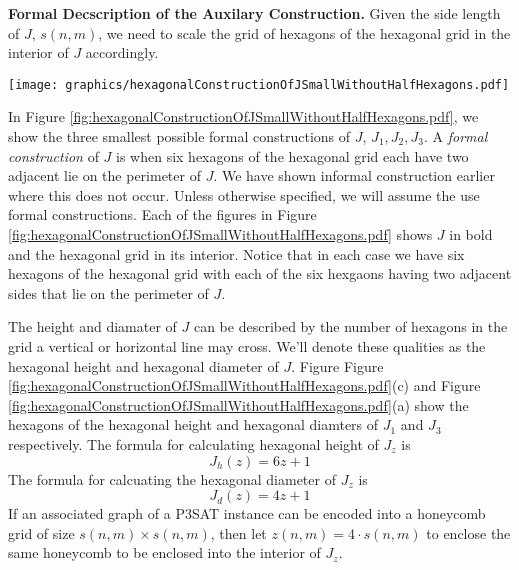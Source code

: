 \documentclass[10pt]{CSUNthesis}
\theoremstyle{plain}%
\theoremstyle{definition}
\theoremstyle{remark}
\begin{document}
\textbf{Formal Decscription of the Auxilary Construction.}
Given the side length of $J$, $s(n,m)$, we need to scale the grid of hexagons of the hexagonal grid in the interior of $J$ accordingly.

\begin{minipage}{\linewidth}
\begin{center}
\texttt{[image: graphics/hexagonalConstructionOfJSmallWithoutHalfHexagons.pdf]}
\label{fig:hexagonalConstructionOfJSmallWithoutHalfHexagons.pdf}
\end{center}
\end{minipage}

In Figure \ref{fig:hexagonalConstructionOfJSmallWithoutHalfHexagons.pdf}, we show the three smallest possible formal constructions of $J$, $J_1, J_2, J_3$.  
A \textit{formal construction} of $J$ is when six hexagons of the hexagonal grid each have two adjacent lie on the perimeter of $J$.
We have shown informal construction earlier where this does not occur.
Unless otherwise specified, we will assume the use formal constructions.
Each of the figures in Figure \ref{fig:hexagonalConstructionOfJSmallWithoutHalfHexagons.pdf} shows $J$ in bold and the hexagonal grid in its interior.
Notice that in each case we have six hexagons of the hexagonal grid with each of the six hexgaons having two adjacent sides that lie on the perimeter of $J$.

The height and diamater of $J$ can be described by the number of hexagons in the grid a vertical or horizontal line may cross. 
We'll denote these qualities as the hexagonal height and hexagonal diameter of $J$.
Figure Figure \ref{fig:hexagonalConstructionOfJSmallWithoutHalfHexagons.pdf}(c) and Figure \ref{fig:hexagonalConstructionOfJSmallWithoutHalfHexagons.pdf}(a) show the hexagons of the hexagonal height and hexagonal diamters of $J_1$ and $J_3$ respectively.  
The formula for calculating hexagonal height of $J_z$ is 
\begin{equation}\label{eqn:Jh}
J_h (z) = 6z+1
\end{equation}
The formula for calcuating the hexagonal diameter of $J_z$ is 
\begin{equation}\label{eqn:Jd}
J_d (z) = 4z+1
\end{equation}
If an associated graph of a P3SAT instance can be encoded into a honeycomb grid of size $s(n,m) \times s(n,m)$, then let $z(n,m)=4\cdot s(n,m)$ to enclose the same honeycomb to be enclosed into the interior of $J_z$.
\end{document}
